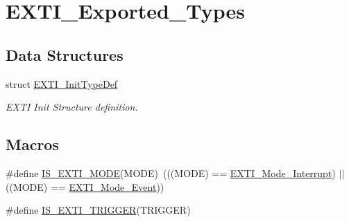 \hypertarget{group___e_x_t_i___exported___types}{}\section{E\+X\+T\+I\+\_\+\+Exported\+\_\+\+Types}
\label{group___e_x_t_i___exported___types}
\subsection*{Data Structures}
\begin{DoxyCompactItemize}
\item 
struct \mbox{\hyperlink{struct_e_x_t_i___init_type_def}{E\+X\+T\+I\+\_\+\+Init\+Type\+Def}}
\begin{DoxyCompactList}\small\item\em E\+X\+TI Init Structure definition. \end{DoxyCompactList}\end{DoxyCompactItemize}
\subsection*{Macros}
\begin{DoxyCompactItemize}
\item 
\#define \mbox{\hyperlink{group___e_x_t_i___exported___types_ga8429170f3320b90227f9f5b252c1c5eb}{I\+S\+\_\+\+E\+X\+T\+I\+\_\+\+M\+O\+DE}}(M\+O\+DE)~(((M\+O\+DE) == \mbox{\hyperlink{group___e_x_t_i___exported___types_ggad5e69af98dc0dfdf64417adc1cf57929a8c6ccdd7b1bc4872731306537e8c3b42}{E\+X\+T\+I\+\_\+\+Mode\+\_\+\+Interrupt}}) $\vert$$\vert$ ((M\+O\+DE) == \mbox{\hyperlink{group___e_x_t_i___exported___types_ggad5e69af98dc0dfdf64417adc1cf57929aa38ef186929ec74786df79877ea124a7}{E\+X\+T\+I\+\_\+\+Mode\+\_\+\+Event}}))
\item 
\#define \mbox{\hyperlink{group___e_x_t_i___exported___types_gaee95ec6288944a6245696896604e509e}{I\+S\+\_\+\+E\+X\+T\+I\+\_\+\+T\+R\+I\+G\+G\+ER}}(T\+R\+I\+G\+G\+ER)
\end{DoxyCompactItemize}

